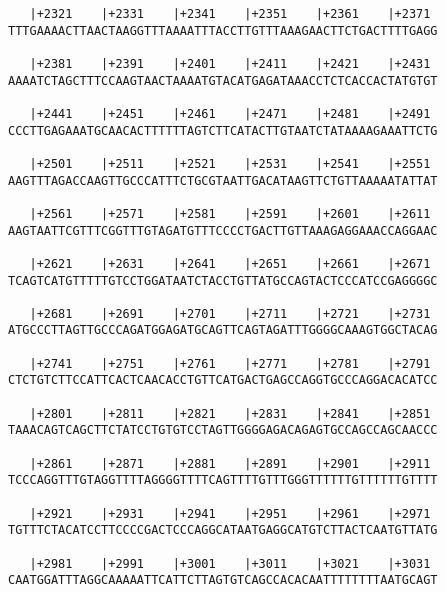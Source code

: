 \documentclass{article}
\begin{document}
\begin{Verbatim}
   |+2321    |+2331    |+2341    |+2351    |+2361    |+2371 
TTTGAAAACTTAACTAAGGTTTAAAATTTACCTTGTTTAAAGAACTTCTGACTTTTGAGG
                                                            
   |+2381    |+2391    |+2401    |+2411    |+2421    |+2431 
AAAATCTAGCTTTCCAAGTAACTAAAATGTACATGAGATAAACCTCTCACCACTATGTGT
                                                            
   |+2441    |+2451    |+2461    |+2471    |+2481    |+2491 
CCCTTGAGAAATGCAACACTTTTTTAGTCTTCATACTTGTAATCTATAAAAGAAATTCTG
                                                            
   |+2501    |+2511    |+2521    |+2531    |+2541    |+2551 
AAGTTTAGACCAAGTTGCCCATTTCTGCGTAATTGACATAAGTTCTGTTAAAAATATTAT
                                                            
   |+2561    |+2571    |+2581    |+2591    |+2601    |+2611 
AAGTAATTCGTTTCGGTTTGTAGATGTTTCCCCTGACTTGTTAAAGAGGAAACCAGGAAC
                                                            
   |+2621    |+2631    |+2641    |+2651    |+2661    |+2671 
TCAGTCATGTTTTTGTCCTGGATAATCTACCTGTTATGCCAGTACTCCCATCCGAGGGGC
                                                            
   |+2681    |+2691    |+2701    |+2711    |+2721    |+2731 
ATGCCCTTAGTTGCCCAGATGGAGATGCAGTTCAGTAGATTTGGGGCAAAGTGGCTACAG
                                                            
   |+2741    |+2751    |+2761    |+2771    |+2781    |+2791 
CTCTGTCTTCCATTCACTCAACACCTGTTCATGACTGAGCCAGGTGCCCAGGACACATCC
                                                            
   |+2801    |+2811    |+2821    |+2831    |+2841    |+2851 
TAAACAGTCAGCTTCTATCCTGTGTCCTAGTTGGGGAGACAGAGTGCCAGCCAGCAACCC
                                                            
   |+2861    |+2871    |+2881    |+2891    |+2901    |+2911 
TCCCAGGTTTGTAGGTTTTAGGGGTTTTCAGTTTTGTTTGGGTTTTTTGTTTTTTGTTTT
                                                            
   |+2921    |+2931    |+2941    |+2951    |+2961    |+2971 
TGTTTCTACATCCTTCCCCGACTCCCAGGCATAATGAGGCATGTCTTACTCAATGTTATG
                                                            
   |+2981    |+2991    |+3001    |+3011    |+3021    |+3031 
CAATGGATTTAGGCAAAAATTCATTCTTAGTGTCAGCCACACAATTTTTTTTAATGCAGT
                                                            

\end{Verbatim}
\end{document}
